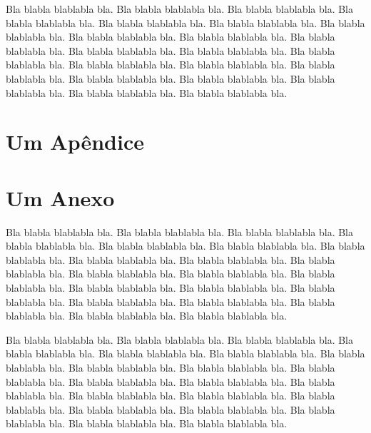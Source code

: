 \documentclass[diss,capa]{texufpel}
\begin{document}
Bla blabla blablabla bla.  Bla blabla blablabla bla.  Bla blabla
blablabla bla.  Bla blabla blablabla bla.  Bla blabla blablabla bla.
Bla blabla blablabla bla.  Bla blabla blablabla bla.  Bla blabla
blablabla bla.  Bla blabla blablabla bla.  Bla blabla blablabla bla.
Bla blabla blablabla bla.  Bla blabla blablabla bla.  Bla blabla
blablabla bla.  Bla blabla blablabla bla.  Bla blabla blablabla bla.
Bla blabla blablabla bla.  Bla blabla blablabla bla.  Bla blabla
blablabla bla.  Bla blabla blablabla bla.  Bla blabla blablabla bla.
Bla blabla blablabla bla.



 

\apendices
\chapter{Um Apêndice}

\anexos
\chapter{Um Anexo}

Bla blabla blablabla bla.  Bla blabla blablabla bla.  Bla blabla
blablabla bla.  Bla blabla blablabla bla.  Bla blabla blablabla bla.
Bla blabla blablabla bla.  Bla blabla blablabla bla.  Bla blabla
blablabla bla.  Bla blabla blablabla bla.  Bla blabla blablabla bla.
Bla blabla blablabla bla.  Bla blabla blablabla bla.  Bla blabla
blablabla bla.  Bla blabla blablabla bla.  Bla blabla blablabla bla.
Bla blabla blablabla bla.  Bla blabla blablabla bla.  Bla blabla
blablabla bla.  Bla blabla blablabla bla.  Bla blabla blablabla bla.
Bla blabla blablabla bla.

Bla blabla blablabla bla.  Bla blabla blablabla bla.  Bla blabla
blablabla bla.  Bla blabla blablabla bla.  Bla blabla blablabla bla.
Bla blabla blablabla bla.  Bla blabla blablabla bla.  Bla blabla
blablabla bla.  Bla blabla blablabla bla.  Bla blabla blablabla bla.
Bla blabla blablabla bla.  Bla blabla blablabla bla.  Bla blabla
blablabla bla.  Bla blabla blablabla bla.  Bla blabla blablabla bla.
Bla blabla blablabla bla.  Bla blabla blablabla bla.  Bla blabla
blablabla bla.  Bla blabla blablabla bla.  Bla blabla blablabla bla.
Bla blabla blablabla bla.
\end{document}
